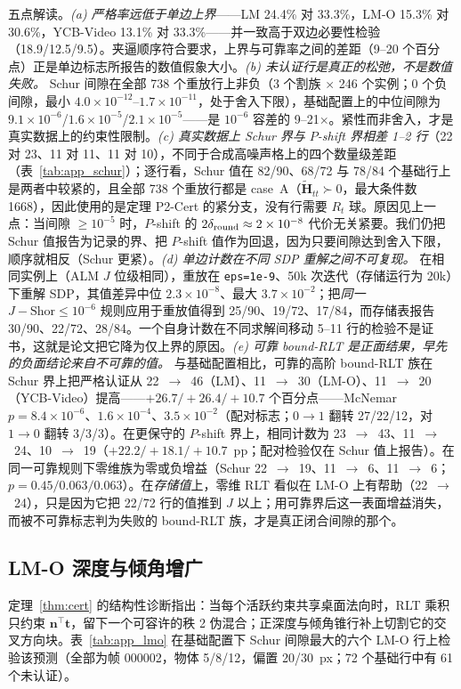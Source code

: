 五点解读。\emph{(a) 严格率远低于单边上界}——LM 24.4\% 对 33.3\%，LM-O 15.3\% 对 30.6\%，YCB-Video 13.1\% 对 33.3\%——并一致高于双边必要性检验（18.9/12.5/9.5）。夹逼顺序符合要求，上界与可靠率之间的差距（9--20 个百分点）正是单边标志所报告的数值假象大小。\emph{(b) 未认证行是真正的松弛，不是数值失败。} Schur 间隙在全部 738 个重放行上非负（3 个割族 $\times$ 246 个实例；0 个负间隙，最小 $4.0\times10^{-12}$--$1.7\times10^{-11}$，处于舍入下限），基础配置上的中位间隙为 $9.1\times10^{-6}$/$1.6\times10^{-5}$/$2.1\times10^{-5}$——是 $10^{-6}$ 容差的 9--21$\times$。紧性而非舍入，才是真实数据上的约束性限制。\emph{(c) 真实数据上 Schur 界与 $P$-shift 界相差 1--2 行}（22 对 23、11 对 11、11 对 10），不同于合成高噪声格上的四个数量级差距（表~\ref{tab:app_schur}）；逐行看，Schur 值在 82/90、68/72 与 78/84 个基础行上是两者中较紧的，且全部 738 个重放行都是 case~A（$\tilde{\mathbf H}_{tt}\succ0$，最大条件数 1668），因此使用的是定理 P2-Cert 的紧分支，没有行需要 $R_t$ 球。原因见上一点：当间隙 $\ge10^{-5}$ 时，$P$-shift 的 $2\delta_{\rm round}\approx2\times10^{-8}$ 代价无关紧要。我们仍把 Schur 值报告为记录的界、把 $P$-shift 值作为回退，因为只要间隙达到舍入下限，顺序就相反（Schur 更紧）。\emph{(d) 单边计数在不同 SDP 重解之间不可复现。} 在相同实例上（ALM $J$ 位级相同），重放在 \texttt{eps=1e-9}、50k 次迭代（存储运行为 20k）下重解 SDP，其值差异中位 $2.3\times10^{-8}$、最大 $3.7\times10^{-2}$；把\emph{同一} $J-\mathrm{Shor}\le10^{-6}$ 规则应用于重放值得到 25/90、19/72、17/84，而存储表报告 30/90、22/72、28/84。一个自身计数在不同求解间移动 5--11 行的检验不是证书，这就是论文把它降为仅上界的原因。\emph{(e) 可靠 bound-RLT 是正面结果，早先的负面结论来自不可靠的值。} 与基础配置相比，可靠的高阶 bound-RLT 族在 Schur 界上把严格认证从 22~$\to$~46（LM）、11~$\to$~30（LM-O）、11~$\to$~20（YCB-Video）提高——$+26.7/+26.4/+10.7$ 个百分点——McNemar $p=8.4\times10^{-6}$、$1.6\times10^{-4}$、$3.5\times10^{-2}$（配对标志；$0\to1$ 翻转 27/22/12，对 $1\to0$ 翻转 3/3/3）。在更保守的 $P$-shift 界上，相同计数为 23~$\to$~43、11~$\to$~24、10~$\to$~19（$+22.2/+18.1/+10.7$~pp；配对检验仅在 Schur 值上报告）。在同一可靠规则下零维族为零或负增益（Schur 22~$\to$~19、11~$\to$~6、11~$\to$~6；$p=0.45/0.063/0.063$）。在\emph{存储值}上，零维 RLT 看似在 LM-O 上有帮助（22~$\to$~24），只是因为它把 22/72 行的值推到 $J$ 以上；用可靠界后这一表面增益消失，而被不可靠标志判为失败的 bound-RLT 族，才是真正闭合间隙的那个。

\subsection{LM-O 深度与倾角增广}\label{app:lmo}
定理~\ref{thm:cert} 的结构性诊断指出：当每个活跃约束共享桌面法向时，RLT 乘积只约束 $\mathbf n^\top\mathbf t$，留下一个可容许的秩 2 伪混合；正深度与倾角锥行补上切割它的交叉方向块。表~\ref{tab:app_lmo} 在基础配置下 Schur 间隙最大的六个 LM-O 行上检验该预测（全部为帧 000002，物体 5/8/12，偏置 20/30~px；72 个基础行中有 61 个未认证）。

